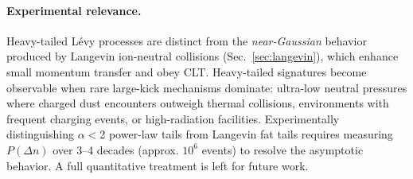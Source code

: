 \paragraph{Experimental relevance.} Heavy-tailed Lévy processes are distinct from the \emph{near-Gaussian} behavior produced by Langevin ion-neutral collisions (Sec.~\ref{sec:langevin}), which enhance small momentum transfer and obey CLT. Heavy-tailed signatures become observable when rare large-kick mechanisms dominate: ultra-low neutral pressures where charged dust encounters outweigh thermal collisions, environments with frequent charging events, or high-radiation facilities. Experimentally distinguishing $\alpha<$2 power-law tails from Langevin fat tails requires measuring $P(\Delta n)$ over 3–4 decades (approx. $10^6$ events) to resolve the asymptotic behavior. A full quantitative treatment is left for future work.